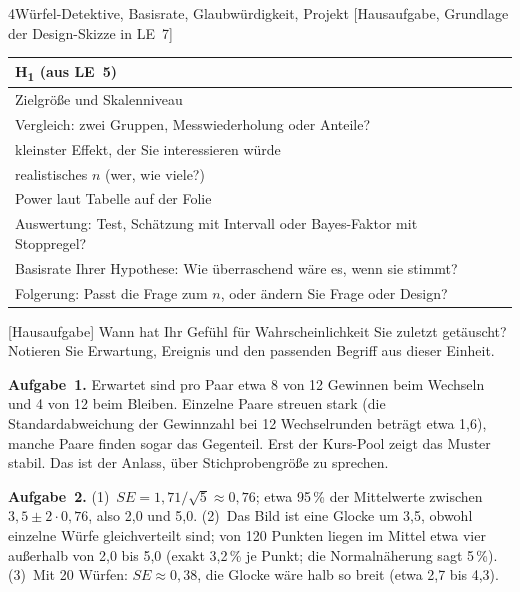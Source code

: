 \begin{uebungsblattb}{4}{Würfel-Detektive, Basisrate, Glaubwürdigkeit, Projekt}
[Hausaufgabe, Grundlage der Design-Skizze in LE~7]
\begin{center}
\renewcommand{\arraystretch}{1.5}
\begin{tabular}{|p{}|p{}|}
\hline
H\textsubscript{1} (aus LE~5) & \\[6mm] \hline
Zielgröße und Skalenniveau & \\ \hline
Vergleich: zwei Gruppen, Messwiederholung oder Anteile? & \\ \hline
kleinster Effekt, der Sie interessieren würde & \\ \hline
realistisches $n$ (wer, wie viele?) & \\ \hline
Power laut Tabelle auf der Folie & \\ \hline
Auswertung: Test, Schätzung mit Intervall oder Bayes-Faktor mit Stoppregel? & \\ \hline
Basisrate Ihrer Hypothese: Wie überraschend wäre es, wenn sie stimmt? & \\ \hline
Folgerung: Passt die Frage zum $n$, oder ändern Sie Frage oder Design? & \\[6mm] \hline
\end{tabular}
\end{center}

[Hausaufgabe]
Wann hat Ihr Gefühl für Wahrscheinlichkeit Sie zuletzt getäuscht?
Notieren Sie Erwartung, Ereignis und den passenden Begriff aus dieser
Einheit.

\begin{lehrhinweis}[Erwartungshorizont]
\textbf{Aufgabe~1.} Erwartet sind pro Paar etwa 8 von 12 Gewinnen beim
Wechseln und 4 von 12 beim Bleiben. Einzelne Paare streuen stark (die
Standardabweichung der Gewinnzahl bei 12 Wechselrunden beträgt etwa 1,6),
manche Paare finden sogar das Gegenteil. Erst der Kurs-Pool zeigt das
Muster stabil. Das ist der Anlass, über Stichprobengröße zu sprechen.

\textbf{Aufgabe~2.} (1)~$\mathit{SE}=1{,}71/\sqrt5\approx0{,}76$;
etwa 95\,\% der Mittelwerte zwischen $3{,}5\pm2\cdot0{,}76$, also 2,0 und
5,0. (2)~Das Bild ist eine Glocke um 3,5, obwohl einzelne Würfe
gleichverteilt sind; von 120 Punkten liegen im Mittel etwa vier
außerhalb von 2,0 bis 5,0 (exakt 3,2\,\% je Punkt; die Normalnäherung
sagt 5\,\%). (3)~Mit 20 Würfen: $\mathit{SE}\approx0{,}38$, die
Glocke wäre halb so breit (etwa 2,7 bis 4,3).


\end{lehrhinweis}
\end{uebungsblattb}

